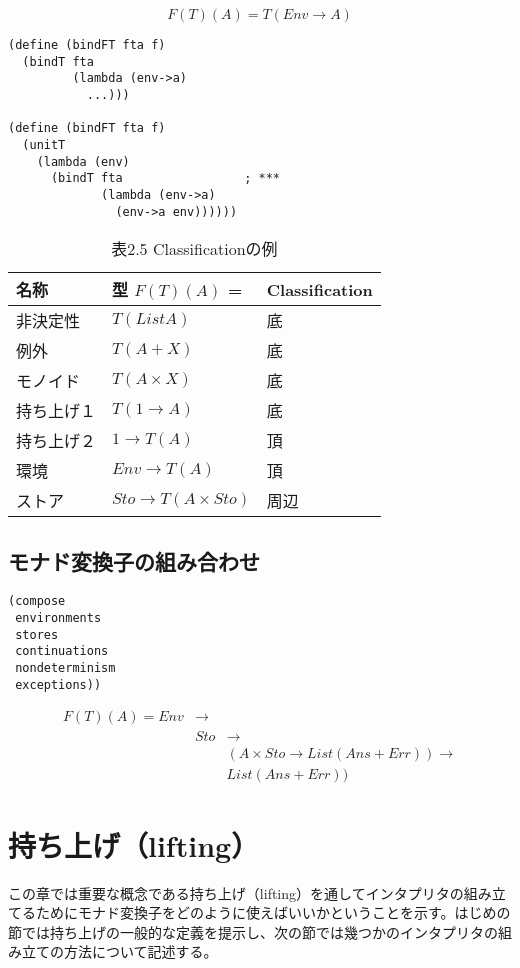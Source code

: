 \documentclass[11pt, oneside]{jsbook}   	%
\begin{document}
$$
F(T)(A) = T(Env \rightarrow A)
$$

\begin{lstlisting}
(define (bindFT fta f)
  (bindT fta
         (lambda (env->a)
           ...)))

(define (bindFT fta f)
  (unitT
    (lambda (env)
      (bindT fta                 ; ***
             (lambda (env->a)
               (env->a env))))))
\end{lstlisting}

\begin{table}[htb]
\label{table2.5}
\caption{表2.5 Classificationの例}
  \begin{tabular}{| l | l | l |} \hline
    名称   & 型 $F(T)(A)$ = & Classification  \\ \hline \hline
    非決定性     & $T(List A)$ & 底  \\
    例外            & $T(A + X)$ & 底  \\
    モノイド     & $T(A \times X)$ & 底  \\
    持ち上げ１ & $T(1 \rightarrow A)$ & 底  \\
    持ち上げ２ & $1 \rightarrow T(A) $ & 頂  \\
    環境            & $Env \rightarrow T(A) $ & 頂  \\ 
    ストア        &  $Sto \rightarrow T(A \times Sto) $ & 周辺  \\ \hline
  \end{tabular}
\end{table}
\section{ モナド変換子の組み合わせ }

\begin{lstlisting}
(compose
 environments
 stores
 continuations
 nondeterminism
 exceptions))
\end{lstlisting}
 
 $$
\begin{array}{lll}
F(T)(A) = Env &\rightarrow 	& 				 \\
			   &Sto 			&\rightarrow  	 \\
			   &				& (A \times  Sto \rightarrow List(Ans + Err)) \rightarrow \\
			   &				&				 List(Ans + Err))
\end{array}
 $$
 
\theendnotes
\setcounter{endnote}{0}

\newpage
\chapter{ 持ち上げ（lifting）}
 この章では重要な概念である持ち上げ（lifting）を通してインタプリタの組み立てるためにモナド変換子をどのように使えばいいかということを示す。はじめの節では持ち上げの一般的な定義を提示し、次の節では幾つかのインタプリタの組み立ての方法について記述する。
\end{document}
